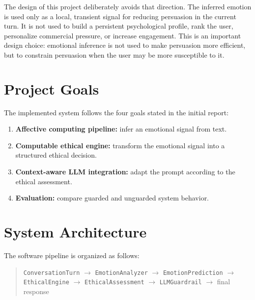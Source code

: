 \documentclass[11pt,a4paper]{article}
\newcommand{\code}[1]{\texttt{#1}}
\begin{document}
The design of this project deliberately avoids that direction. The inferred emotion is used
only as a local, transient signal for reducing persuasion in the current turn. It is not used
to build a persistent psychological profile, rank the user, personalize commercial pressure,
or increase engagement. This is an important design choice: emotional inference is not used
to make persuasion more efficient, but to constrain persuasion when the user may be more
susceptible to it.

\section{Project Goals}

The implemented system follows the four goals stated in the initial report:

\begin{enumerate}[leftmargin=1.8em]
\item \textbf{Affective computing pipeline:} infer an emotional signal from text.
\item \textbf{Computable ethical engine:} transform the emotional signal into a structured
ethical decision.
\item \textbf{Context-aware LLM integration:} adapt the prompt according to the ethical
assessment.
\item \textbf{Evaluation:} compare guarded and unguarded system behavior.
\end{enumerate}

\section{System Architecture}

The software pipeline is organized as follows:

\begin{quote}
\code{ConversationTurn} $\rightarrow$ \code{EmotionAnalyzer} $\rightarrow$
\code{EmotionPrediction} $\rightarrow$ \code{EthicalEngine} $\rightarrow$
\code{EthicalAssessment} $\rightarrow$ \code{LLMGuardrail} $\rightarrow$
final response
\end{quote}
\end{document}
